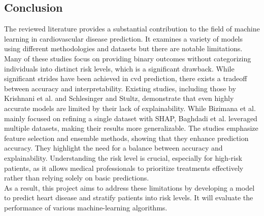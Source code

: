 \subsection{Conclusion}
The reviewed literature provides a substantial contribution to the field of machine learning in cardiovascular disease prediction. It examines a variety of models using different methodologies and datasets but there are notable limitations. \\Many of these studies focus on providing binary outcomes without categorizing individuals into distinct risk levels, which is a significant drawback. While significant strides have been achieved in \gls{cvd} prediction, there exists a tradeoff between accuracy and interpretability. Existing studies, including those by Krishnani et al. and Schlesinger and Stultz, demonstrate that even highly accurate models are limited by their lack of explainability. While Bizimana et al. mainly focused on refining a single dataset with SHAP, Baghdadi et al. leveraged multiple datasets, making their results more generalizable. The studies emphasize feature selection and ensemble methods, showing that they enhance prediction accuracy. They highlight the need for a balance between accuracy and explainability. Understanding the risk level is crucial, especially for high-risk patients, as it allows medical professionals to prioritize treatments effectively rather than relying solely on basic predictions.\vspace{0.5cm } \\ As a result, this project aims to address these limitations by developing a model to predict heart disease and stratify patients into risk levels. It will evaluate the performance of various machine-learning algorithms.
